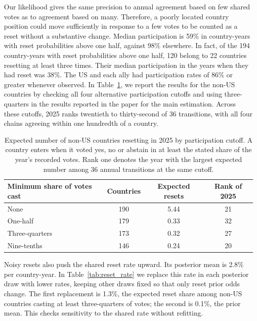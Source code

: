 \documentclass[10pt,authoryear]{elsarticle}
\begin{document}
Our likelihood gives the same precision to annual agreement based on few shared votes as to agreement based on many. Therefore, a poorly located country position could move sufficiently in response to a few votes to be counted as a reset without a substantive change. Median participation is 59\% in country-years with reset probabilities above one half, against 98\% elsewhere. In fact, of the 194 country-years with reset probabilities above one half, 120 belong to 22 countries resetting at least three times. Their median participation in the years when they had reset was 38\%. The US and each ally had participation rates of 86\% or greater whenever observed. In Table~\ref{tab:reset_participation}, we report the results for the non-US countries by checking all four alternative participation cutoffs and using three-quarters in the results reported in the paper for the main estimation. Across these cutoffs, 2025 ranks twentieth to thirty-second of 36 transitions, with all four chains agreeing within one hundredth of a country.

\begin{table}[ht]
\centering\small
\caption{Expected number of non-US countries resetting in 2025 by participation cutoff. A country enters when it voted yes, no or abstain in at least the stated share of the year's recorded votes. Rank one denotes the year with the largest expected number among 36 annual transitions at the same cutoff.}
\label{tab:reset_participation}
\begin{tabular}{lccc}\toprule
Minimum share of votes cast & Countries & Expected resets & Rank of 2025\\\midrule
None & 190 & 5.44 & 21\\
One-half & 179 & 0.33 & 32\\
Three-quarters & 173 & 0.32 & 27\\
Nine-tenths & 146 & 0.24 & 20\\
\bottomrule
\end{tabular}
\end{table}

Noisy resets also push the shared reset rate upward. Its posterior mean is 2.8\% per country-year. In Table~\ref{tab:reset_rate} we replace this rate in each posterior draw with lower rates, keeping other draws fixed so that only reset prior odds change. The first replacement is 1.3\%, the expected reset share among non-US countries casting at least three-quarters of votes; the second is 0.1\%, the prior mean. This checks sensitivity to the shared rate without refitting.
\end{document}
